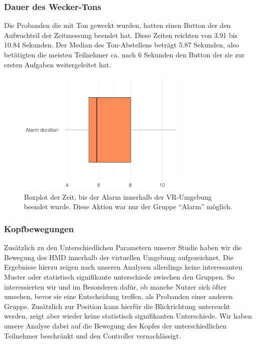 \subsubsection{Dauer des Wecker-Tons}

Die Probanden die mit Ton geweckt wurden, hatten einen Button der den Aufwachteil der Zeitmessung beendet hat. Diese Zeiten reichten von 3.91 bis 10.84 Sekunden. Der Median des Ton-Abstellens beträgt 5.87 Sekunden, also betätigten die meisten Teilnehmer ca. nach 6 Sekunden den Button der sie zur ersten Aufgaben weitergeleitet hat. 

\begin{figure}[H]
	\centering
	\includegraphics[width=0.75\textwidth]{./_StudyResults/alarmDurationHist}
	\caption{Boxplot der Zeit, bis der Alarm innerhalb der VR-Umgebung beendet wurde. Diese Aktion war nur der Gruppe "`Alarm"' möglich.}
	\label{fig:alarmDurationHist}
\end{figure}

\subsubsection{Kopfbewegungen}

Zusätzlich zu den Unterschiedlichen Parametern unserer Studie haben wir die Bewegung des HMD innerhalb der virtuellen Umgebung aufgezeichnet. 
Die Ergebnisse hierzu zeigen nach unseren Analysen allerdings keine interessanten Muster oder statistisch signifikante unterschiede zwischen den Gruppen. 
So interessierten wir und im Besonderen dafür, ob manche Nutzer sich öfter umsehen, bevor sie eine Entscheidung treffen, als Probanden einer anderen Gruppe. 
Zusätzlich zur Position kann hierfür die Blickrichtung untersucht werden, zeigt aber wieder keine statistisch signifikanten Unterschiede.
Wir haben unsere Analyse dabei auf die Bewegung des Kopfes der unterschiedlichen Teilnehmer beschränkt und den Controller vernachlässigt.

